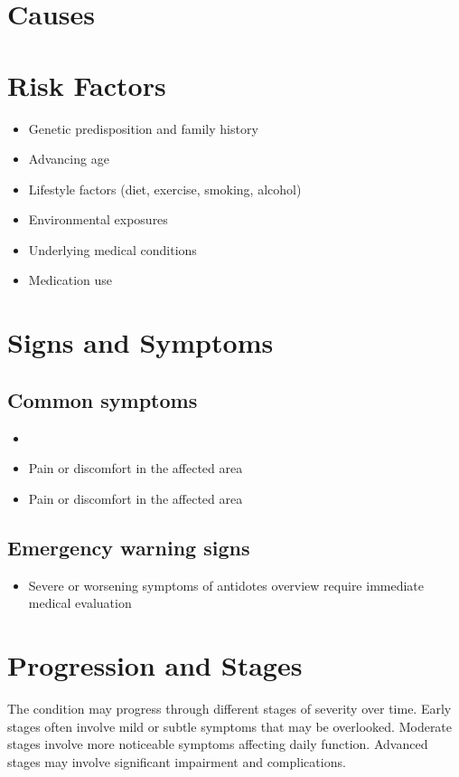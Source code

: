 \section{Causes}
\section{Risk Factors}

\begin{itemize}[noitemsep]
  \item Genetic predisposition and family history
  \item Advancing age
  \item Lifestyle factors (diet, exercise, smoking, alcohol)
  \item Environmental exposures
  \item Underlying medical conditions
  \item Medication use
\end{itemize}
\section{Signs and Symptoms}

\subsection{Common symptoms}
\begin{itemize}[noitemsep]
  \item \item Pain or discomfort in the affected area    \item Pain or discomfort in the affected area
  \end{itemize}

\subsection{Emergency warning signs}
\begin{itemize}[noitemsep]
  \item Severe or worsening symptoms of antidotes overview require immediate medical evaluation
\end{itemize}
\section{Progression and Stages}
The condition may progress through different stages of severity over time. Early stages often involve mild or subtle symptoms that may be overlooked. Moderate stages involve more noticeable symptoms affecting daily function. Advanced stages may involve significant impairment and complications.
